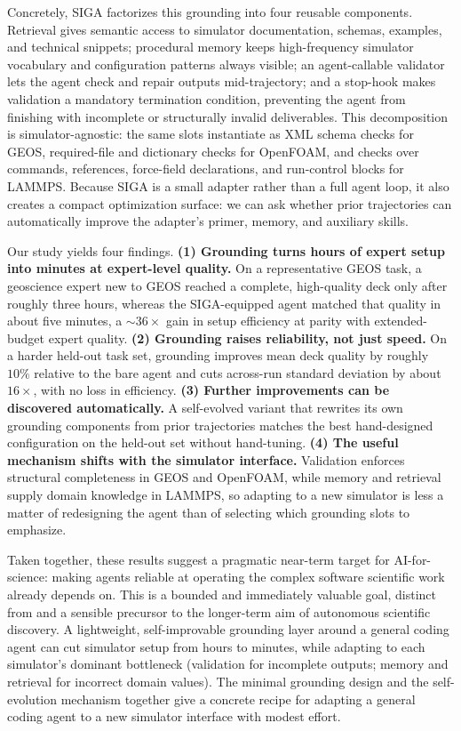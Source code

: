 \documentclass{article}
\begin{document}
Concretely, SIGA factorizes this grounding into four reusable components. Retrieval gives semantic access to simulator documentation, schemas, examples, and technical snippets; procedural memory keeps high-frequency simulator vocabulary and configuration patterns always visible; an agent-callable validator lets the agent check and repair outputs mid-trajectory; and a stop-hook makes validation a mandatory termination condition, preventing the agent from finishing with incomplete or structurally invalid deliverables. This decomposition is simulator-agnostic: the same slots instantiate as XML schema checks for GEOS, required-file and dictionary checks for OpenFOAM, and checks over commands, references, force-field declarations, and run-control blocks for LAMMPS. Because SIGA is a small adapter rather than a full agent loop, it also creates a compact optimization surface: we can ask whether prior trajectories can automatically improve the adapter’s primer, memory, and auxiliary skills.

Our study yields four findings. \textbf{(1) Grounding turns hours of expert setup into minutes at expert-level quality.} On a representative GEOS task, a geoscience expert new to GEOS reached a complete, high-quality deck only after roughly three hours, whereas the SIGA-equipped agent matched that quality in about five minutes, a ${\sim}36\times$ gain in setup efficiency at parity with extended-budget expert quality. \textbf{(2) Grounding raises reliability, not just speed.} On a harder held-out task set, grounding improves mean deck quality by roughly $10\%$ relative to the bare agent and cuts across-run standard deviation by about $16\times$, with no loss in efficiency. \textbf{(3) Further improvements can be discovered automatically.} A self-evolved variant that rewrites its own grounding components from prior trajectories matches the best hand-designed configuration on the held-out set without hand-tuning. \textbf{(4) The useful mechanism shifts with the simulator interface.} Validation enforces structural completeness in GEOS and OpenFOAM, while memory and retrieval supply domain knowledge in LAMMPS, so adapting to a new simulator is less a matter of redesigning the agent than of selecting which grounding slots to emphasize.

Taken together, these results suggest a pragmatic near-term target for AI-for-science: making agents reliable at operating the complex software scientific work already depends on. This is a bounded and immediately valuable goal, distinct from and a sensible precursor to the longer-term aim of autonomous scientific discovery. A lightweight, self-improvable grounding layer around a general coding agent can cut simulator setup from hours to minutes, while adapting to each simulator's dominant bottleneck (validation for incomplete outputs; memory and retrieval for incorrect domain values). The minimal grounding design and the self-evolution mechanism together give a concrete recipe for adapting a general coding agent to a new simulator interface with modest effort.
\end{document}
